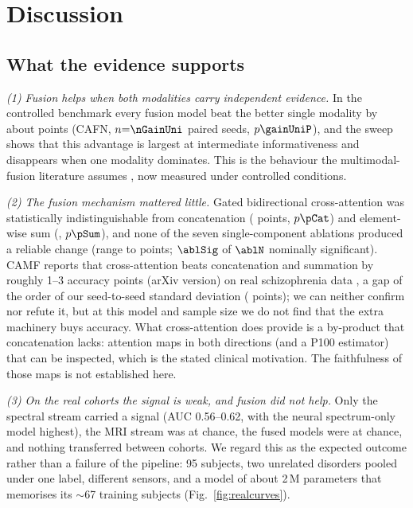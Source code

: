 \section{Discussion}\label{sec:discussion}
\subsection{What the evidence supports}
\emph{(1) Fusion helps when both modalities carry independent evidence.} In the controlled benchmark every fusion model beat the better single modality by about \gainUni{} points (CAFN, $n{=}\nGainUni$ paired seeds, $p\gainUniP$), and the sweep shows that this advantage is largest at intermediate informativeness and disappears when one modality dominates. This is the behaviour the multimodal-fusion literature assumes \cite{calhoun2016,baltrusaitis2019}, now measured under controlled conditions.

\emph{(2) The fusion mechanism mattered little.} Gated bidirectional cross-attention was statistically indistinguishable from concatenation (\dCat{} points, $p\pCat$) and element-wise sum (\dSum{}, $p\pSum$), and none of the seven single-component ablations produced a reliable change (range \ablMin{} to \ablMax{} points; $\ablSig$ of $\ablN$ nominally significant). CAMF reports that cross-attention beats concatenation and summation by roughly 1--3 accuracy points (arXiv version) on real schizophrenia data \cite{zhou2024camf}, a gap of the order of our seed-to-seed standard deviation (\sdAll{} points); we can neither confirm nor refute it, but at this model and sample size we do not find that the extra machinery buys accuracy. What cross-attention does provide is a by-product that concatenation lacks: attention maps in both directions (and a P100 estimator) that can be inspected, which is the stated clinical motivation. The faithfulness of those maps is not established here.

\emph{(3) On the real cohorts the signal is weak, and fusion did not help.} Only the spectral stream carried a signal (AUC 0.56--0.62, with the neural spectrum-only model highest), the MRI stream was at chance, the fused models were at chance, and nothing transferred between cohorts. We regard this as the expected outcome rather than a failure of the pipeline: 95 subjects, two unrelated disorders pooled under one label, different sensors, and a model of about 2\,M parameters that memorises its $\sim$67 training subjects (Fig.~\ref{fig:realcurves}).

